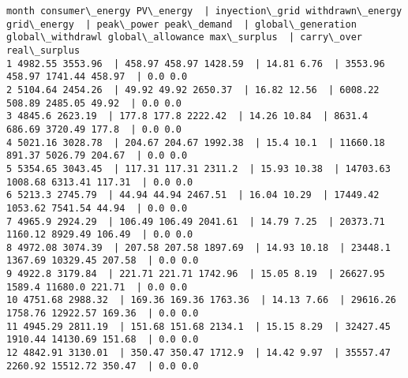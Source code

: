 \documentclass[11pt]{article}
\begin{document}
    \begin{Verbatim}[commandchars=\\\{\}]
month consumer\_energy PV\_energy  | inyection\_grid withdrawn\_energy grid\_energy  | peak\_power peak\_demand  | global\_generation global\_withdrawl global\_allowance max\_surplus  | carry\_over real\_surplus
1 4982.55 3553.96  | 458.97 458.97 1428.59  | 14.81 6.76  | 3553.96 458.97 1741.44 458.97  | 0.0 0.0
2 5104.64 2454.26  | 49.92 49.92 2650.37  | 16.82 12.56  | 6008.22 508.89 2485.05 49.92  | 0.0 0.0
3 4845.6 2623.19  | 177.8 177.8 2222.42  | 14.26 10.84  | 8631.4 686.69 3720.49 177.8  | 0.0 0.0
4 5021.16 3028.78  | 204.67 204.67 1992.38  | 15.4 10.1  | 11660.18 891.37 5026.79 204.67  | 0.0 0.0
5 5354.65 3043.45  | 117.31 117.31 2311.2  | 15.93 10.38  | 14703.63 1008.68 6313.41 117.31  | 0.0 0.0
6 5213.3 2745.79  | 44.94 44.94 2467.51  | 16.04 10.29  | 17449.42 1053.62 7541.54 44.94  | 0.0 0.0
7 4965.9 2924.29  | 106.49 106.49 2041.61  | 14.79 7.25  | 20373.71 1160.12 8929.49 106.49  | 0.0 0.0
8 4972.08 3074.39  | 207.58 207.58 1897.69  | 14.93 10.18  | 23448.1 1367.69 10329.45 207.58  | 0.0 0.0
9 4922.8 3179.84  | 221.71 221.71 1742.96  | 15.05 8.19  | 26627.95 1589.4 11680.0 221.71  | 0.0 0.0
10 4751.68 2988.32  | 169.36 169.36 1763.36  | 14.13 7.66  | 29616.26 1758.76 12922.57 169.36  | 0.0 0.0
11 4945.29 2811.19  | 151.68 151.68 2134.1  | 15.15 8.29  | 32427.45 1910.44 14130.69 151.68  | 0.0 0.0
12 4842.91 3130.01  | 350.47 350.47 1712.9  | 14.42 9.97  | 35557.47 2260.92 15512.72 350.47  | 0.0 0.0

    \end{Verbatim}
\end{document}

